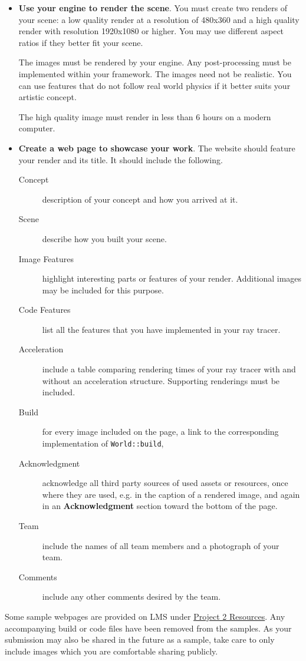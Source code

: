 \documentclass[addpoints]{exam}
\begin{document}
\begin{questions}
\begin{itemize}
  \item \textbf{Use your engine to render the scene}. You must create two renders of your scene: a low quality render at a resolution of 480x360 and a high quality render with resolution 1920x1080 or higher. You may use different aspect ratios if they better fit your scene.
    
    The images must be rendered by your engine. Any post-processing must be implemented within your framework. The images need not be realistic. You can use features that do not follow real world physics if it better suits your artistic concept.
    
    The high quality image must render in less than 6 hours on a modern computer.

  \item \textbf{Create a web page to showcase your work}. The website should feature your render and its title. It should include the following.
    \begin{description}
    \item[Concept] description of your concept and how you arrived at it.
    \item[Scene] describe how you built your scene.
    \item[Image Features] highlight interesting parts or features of your render. Additional images may be included for this purpose.
    \item[Code Features] list all the features that you have implemented in your ray tracer.
    \item[Acceleration] include a table comparing rendering times of your ray tracer with and without an acceleration structure. Supporting renderings must be included.
    \item[Build] for every image included on the page, a link to the corresponding implementation of {\tt World::build},
    \item[Acknowledgment] acknowledge all third party sources of used assets or resources, once where they are used, e.g. in the caption of a rendered image, and again in an \textbf{Acknowledgment} section toward the bottom of the page.
    \item[Team] include the names of all team members and a photograph of your team.
    \item[Comments] include any other comments desired by the team.
    \end{description}
  \end{itemize}

  Some sample webpages are provided on LMS under \href{https://hulms.instructure.com/courses/1622/pages/project-2-resources?module_item_id=55192}{Project 2 Resources}. Any accompanying build or code files have been removed from the samples. As your submission may also be shared in the future as a sample, take care to only include images which you are comfortable sharing publicly.
  
\end{questions}
\end{document}
